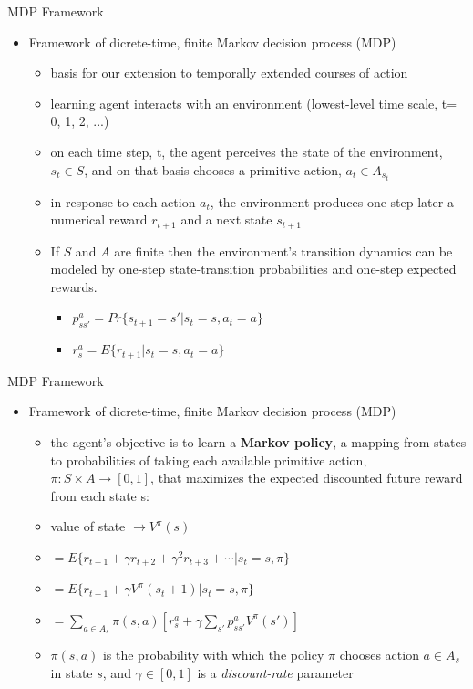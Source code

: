 \begin{frame}{MDP Framework}
    \begin{itemize}
        \item Framework of dicrete-time, finite Markov decision process (MDP)
        \begin{itemize}
            \item basis for our extension to temporally extended courses of action
            \item learning agent interacts with an environment (lowest-level time scale, t= 0, 1, 2, ...)
            \item on each time step, t, the agent perceives the state of the environment, $s_t \in S$, and on that basis chooses a primitive action, $a_t \in A_{s_t}$
            \item in response to each action $a_t$, the environment produces one step later a numerical reward $r_{t+1}$ and a next state $s_{t+1}$
            \item If $S$ and $A$ are finite then the environment's transition dynamics can be modeled by one-step state-transition probabilities and one-step expected rewards.
            \begin{itemize}
                \item $p^a_{ss'} = Pr\{s_{t+1}=s'|s_t=s, a_t=a\}$
                \item $r^a_s = E\{r_{t+1}|s_t=s, a_t=a\}$
            \end{itemize}
        \end{itemize}
    \end{itemize}
\end{frame}

\begin{frame}{MDP Framework}
    \begin{itemize}
        \item Framework of dicrete-time, finite Markov decision process (MDP)
        \begin{itemize}
            \item the agent's objective is to learn a \textbf{Markov policy}, a mapping from states to probabilities of taking each available primitive action, $\pi : S \times A \rightarrow [0,1]$, that maximizes the expected discounted future reward from each state s:
            \item value of state $\rightarrow V^\pi(s)$
            \item $= E\{r_{t+1} + \gamma r_{t+2} + \gamma^2 r_{t+3} + \cdots | s_t = s,\pi\}$
            \item $ = E\{r_{t+1} + \gamma V^\pi(s_t+1)|s_t=s,\pi\}$
            \item $= \sum_{a \in A_s} \pi (s,a) \left [ r^a_s + \gamma \sum_{s'}p^a_{ss'}V^\pi(s') \right ]$
            \item $\pi(s,a)$ is the probability with which the policy $\pi$ chooses action $a \in A_s$ in state $s$, and $\gamma \in [0,1]$ is a \textit{discount-rate} parameter
        \end{itemize}
    \end{itemize}
\end{frame}

